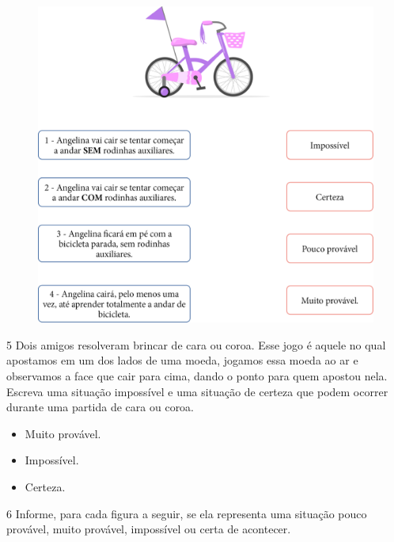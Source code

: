 \begin{figure}[htpb!]
\includegraphics[width=\textwidth]{./media/image87.png}
\end{figure}


\num{5} Dois amigos resolveram brincar de cara ou coroa. Esse jogo é aquele no
qual apostamos em um dos lados de uma moeda, jogamos essa moeda ao ar e observamos a face
que cair para cima, dando o ponto para quem apostou nela. Escreva uma
situação impossível e uma situação de certeza que podem ocorrer durante uma partida de cara ou coroa.

\pagebreak
\begin{itemize}
\item Muito provável.

\item Impossível.


\item Certeza.

\end{itemize}

\pagebreak
\num{6} Informe, para cada figura a seguir, se ela representa uma situação pouco
provável, muito provável, impossível ou certa de acontecer.

